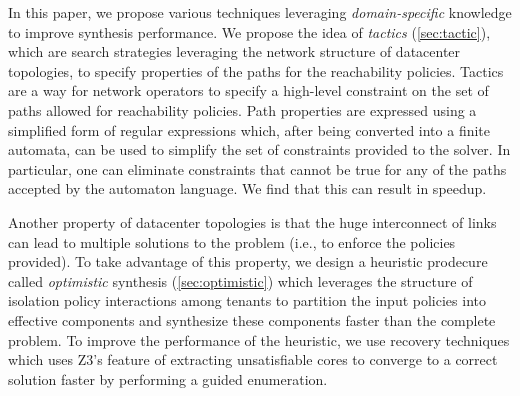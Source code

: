 In this paper, we propose various techniques leveraging
\emph{domain-specific} knowledge to improve synthesis performance. We
propose the idea of \emph{tactics} (\cref{sec:tactic}), which are
search strategies leveraging the network structure of datacenter
topologies, to specify properties of the paths for the reachability
policies.  Tactics are a way for network operators to specify a
high-level constraint on the set of paths allowed for reachability
policies.  Path properties are expressed using a simplified form of
regular expressions which, after being converted into a finite
automata, can be used to simplify the set of constraints provided to
the solver.  In particular, one can eliminate constraints that cannot
be true for any of the paths accepted by the automaton language. We
find that this can result in  speedup.    


Another property of datacenter topologies is that the huge
interconnect of links can lead to multiple solutions to the problem
(i.e., to enforce the policies provided).  To take advantage of this
property, we design a heuristic prodecure called \emph{optimistic}
synthesis (\cref{sec:optimistic}) which leverages the structure of
isolation policy interactions among tenants to partition the input
policies into effective components and synthesize these components
faster than the complete problem. To improve the performance of the
heuristic, we use recovery techniques which uses Z3's feature of
extracting unsatisfiable cores to converge to a correct solution
faster by performing a guided enumeration.   

